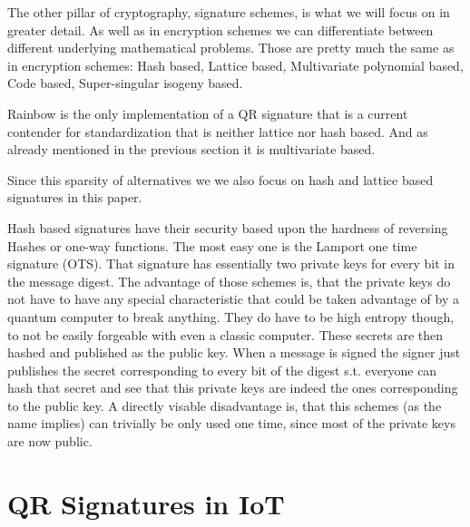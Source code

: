 \documentclass[conference]{IEEEtran}
\newcommand{\comment}[1]{}
\begin{document}
The other pillar of cryptography, signature schemes, is what we will focus on in greater detail.
As well as in encryption schemes we can differentiate between different underlying mathematical problems. Those are pretty much the same as in encryption schemes: 
Hash based,
Lattice based,
Multivariate polynomial based,
Code based,
Super-singular isogeny based.

Rainbow is the only implementation of a QR signature that is a current contender for standardization that is neither lattice nor hash based.
And as already mentioned in the previous section it is multivariate based.

Since this sparsity of alternatives we we also focus on hash and lattice based signatures in this paper.

Hash based signatures have their security based upon the hardness of reversing Hashes or one-way functions.
The most easy one is the Lamport one time signature (OTS).
That signature has essentially two private keys for every bit in the message digest. 
The advantage of those schemes is, that the private keys do not have to have any special characteristic that could be taken advantage of by a quantum computer to break anything.
They do have to be high entropy though, to not be easily forgeable with even a classic computer. These secrets are then hashed and published as the public key.
When a message is signed the signer just publishes the secret corresponding to every bit of the digest s.t. everyone can hash that secret and see that this private keys are indeed the ones corresponding to the public key.
A directly visable disadvantage is, that this schemes (as the name implies) can trivially be only used one time, since most of the private keys are now public.


\section{QR Signatures in IoT}
\comment{ %
Stack usage:
    name            & KeyGen    & Sign  & Verify
    Dilithium-3     & 50k       & 86k   & 54k
    newer dil(dyn)  & not meas  & 52k   & 36k \cite{update_sign}
    newer dil(sta)  & aheadOf t & 35k   & 19k \cite{update_sign}
    qTESLA-1        & 22k       & 29k   & 23k
    qTESLA-3        & 43k       & 28k   & 45k
    Falcon-5        & 120k      & 120k  & 120k
    newer FALCON    & not meas  & 42k   & 4.7k \cite{update_sign}

Clock cycles (10mil ~ 60ms (ARM M4 (168Mhz))):
    name        & KeyGen    & Sign  & Verify
    Dilithium-3 & 2.3m      & 8.3m  & 2.3m
    Dilithium-3 & 2.1       & 7.2   & 2.1 \cite{Energy_comp}
    Falcon-5    & 365m      & 165m  & 1m
    Falcon      & note meas & 75m   & 1m \cite{update_sign}
    qTESLA-3    & 30m       & 11m   & 2.2m
    \cite{QR_Iot_Lattice}

Hash-Based Sphincs promising since stateless, but many parameters to set \cite{QR_IoT_Energy}

as of \cite{QR_comparison} only schemes (out of ~50) with < 4kbit: SIKE and Round5 
} %
\end{document}
